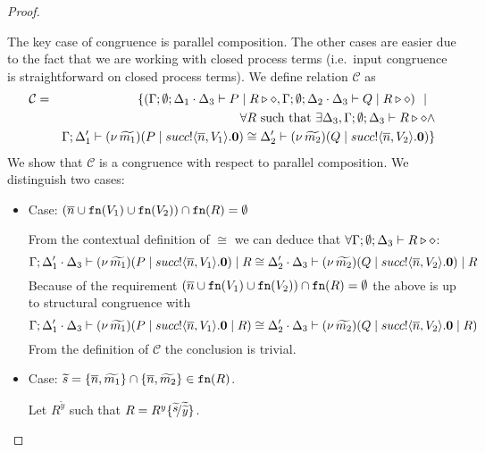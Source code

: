 \begin{proof}
\begin{itemize}
				The key case of congruence is parallel composition.
				The other cases are easier due to the fact that we are
				working with closed process terms (i.e.~input congruence is straightforward
				on closed process terms).
				We define relation $\mathcal{C}$ as
				\begin{eqnarray*}
					\mathcal{C} &=&
					\{	(\Gamma; \emptyset; \Delta_1 \cdot \Delta_3 \vdash P \;|\; R \triangleright \diamond,
							\Gamma; \emptyset; \Delta_2 \cdot \Delta_3 \vdash Q \;|\; R \triangleright \diamond) \ \ |\ \ 
					\\
					& &	\forall R \textrm{ such that } \exists \Delta_3, \Gamma;\emptyset; \Delta_3 \vdash R \triangleright \diamond \land\\
					& &	\Gamma; \Delta_1' \vdash (\nu\, \widetilde{m_1})(P \;|\; succ ! \langle \overline{n}, V_1 \rangle . \mathbf{0}) \cong \Delta_2' \vdash (\nu\, \widetilde{m_2})(Q \;|\; succ ! \langle \overline{n}, V_2 \rangle . \mathbf{0})\}
				\end{eqnarray*}
				We show that $\mathcal{C}$ is a congruence with respect to parallel composition.
				We distinguish two cases:
				\begin{itemize}
					\item	Case: $(\overline{n} \cup \mathtt{fn}(V_1) \cup \mathtt{fn}(V_2)) \cap \mathtt{fn}(R) = \emptyset$

							From the contextual definition of $\cong$ we can deduce that
							$\forall \Gamma; \emptyset; \Delta_3 \vdash R \triangleright \diamond$:
							\[
								\Gamma; \Delta_1' \cdot \Delta_3 \vdash (\nu\, \widetilde{m_1})(P \;|\; succ ! \langle \overline{n}, V_1 \rangle . \mathbf{0}) \;|\; R \cong \Delta_2' \cdot \Delta_3 \vdash (\nu\, \widetilde{m_2})(Q \;|\; succ ! \langle \overline{n}, V_2 \rangle . \mathbf{0}) \;|\; R
							\]
							Because of the requirement
							$(\overline{n} \cup \mathtt{fn}(V_1) \cup \mathtt{fn}(V_2)) \cap \mathtt{fn}(R) = \emptyset$
							the above is up to structural congruence with
							\[
								\Gamma; \Delta_1' \cdot \Delta_3 \vdash (\nu\, \widetilde{m_1})(P \;|\; succ ! \langle \overline{n}, V_1 \rangle . \mathbf{0} \;|\; R) \cong \Delta_2' \cdot \Delta_3 \vdash (\nu\, \widetilde{m_2})(Q \;|\; succ ! \langle \overline{n}, V_2 \rangle . \mathbf{0} \;|\; R)
							\]
							From the definition of $\mathcal{C}$ the conclusion is trivial.

					\item	Case: $\widetilde{s} = \{\overline{n}, \widetilde{m_1}\} \cap \{\overline{n}, \widetilde{m_2}\} \in \mathtt{fn}(R)$.

							Let $R^{\widetilde{y}}$ such that $R = R^{y}\subst{\widetilde{s}}{\widetilde{\widetilde{y}}}$.



\end{itemize}
\end{itemize}
\end{proof}
